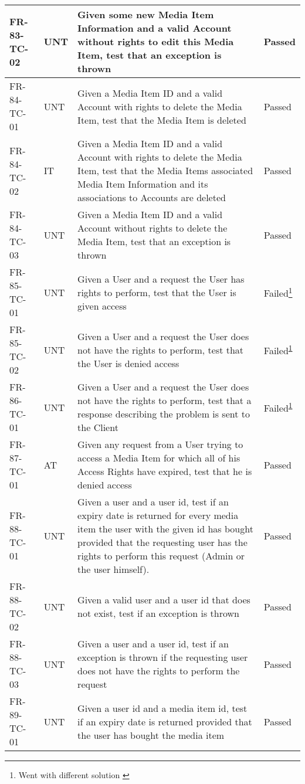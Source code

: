 \documentclass[../report.tex]{subfiles}
\newcommand{\footnoteref}[1]{\textsuperscript{\ref{#1}}}
\begin{document}
\begin{longtable}{|L{2.1cm}|L{1cm}|L{12.4cm}|L{1.4cm}|}
FR-83-TC-02&UNT&Given some new Media Item Information and a valid Account without rights to edit this Media Item, test that an exception is thrown&Passed  \\ \hline
FR-84-TC-01&UNT&Given a Media Item ID and a valid Account with rights to delete the Media Item, test that the Media Item is deleted&Passed  \\ \hline
FR-84-TC-02&IT&Given a Media Item ID and a valid Account with rights to delete the Media Item, test that the Media Items associated Media Item Information and its associations to Accounts are deleted&Passed  \\ \hline
FR-84-TC-03&UNT&Given a Media Item ID and a valid Account without rights to delete the Media Item, test that an exception is thrown&Passed  \\ \hline
FR-85-TC-01&UNT&Given a User and a request the User has rights to perform, test that the User is given access &Failed\footnote{Went with different solution \label{note3}}  \\ \hline
FR-85-TC-02&UNT&Given a User and a request the User does not have the rights to perform, test that the User is denied access&Failed\footnoteref{note3}  \\ \hline
FR-86-TC-01&UNT&Given a User and a request the User does not have the rights to perform, test that a response describing the problem is sent to the Client&Failed\footnoteref{note3}  \\ \hline
FR-87-TC-01&AT&Given any request from a User trying to access a Media Item for which all of his Access Rights have expired, test that he is denied access&Passed  \\ \hline
FR-88-TC-01&UNT&Given a user and a user id, test if an expiry date is returned for every media item the user with the given id has bought provided that the requesting user has the rights to perform this request (Admin or the user himself).&Passed  \\ \hline
FR-88-TC-02&UNT&Given a valid user and a user id that does not exist, test if an exception is thrown&Passed  \\ \hline
FR-88-TC-03&UNT&Given a user and a user id, test if an exception is thrown if the requesting user does not have the rights to perform the request&Passed  \\ \hline
FR-89-TC-01&UNT&Given a user id and a media item id, test if an expiry date is returned provided that the user has bought the media item&Passed  \\ \hline

\end{longtable}
\end{document}
